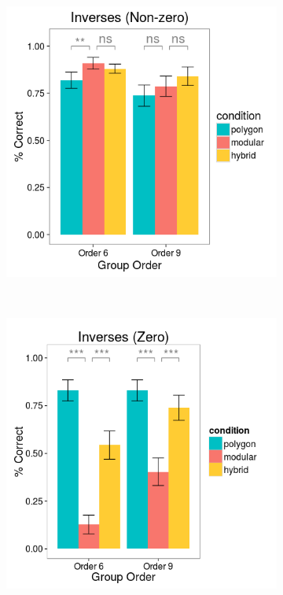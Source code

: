 \documentclass[man,mask,10pt]{apa6}
\begin{document}
\begin{figure}[H]
\centering
\begin{subfigure}[c]{0.3\textwidth}
\centering
\includegraphics[width=\textwidth]{figures/2/in_NZ_r.png}
\end{subfigure}
~
\begin{subfigure}[c]{0.3\textwidth}
\centering
\includegraphics[width=\textwidth]{figures/2/in_Z_r.png}

\end{subfigure}
\end{figure}
\end{document}
